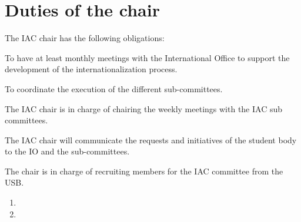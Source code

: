 {\protect\section{Duties of the chair}
The IAC chair has the following obligations:
\protect\begin{parenum}
	\item To have at least monthly meetings with the International Office to support the
	development of the internationalization process.
	\item To coordinate the execution of the different sub-committees.
	\item The IAC chair is in charge of chairing the weekly meetings with the IAC sub
	committees.
	\item The IAC chair will communicate the requests and initiatives of the student body to the
	IO and the sub-committees.
	\item The chair is in charge of recruiting members for the IAC committee from the USB.	
\end{parenum}
}


\begin{enumerate}
    \item {}
    \item {}
\end{enumerate}
